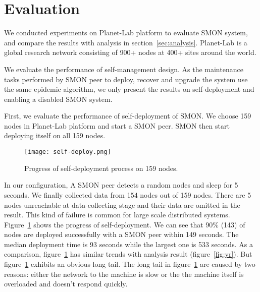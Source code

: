 \section{Evaluation}
\label{sec:eval}

We conducted experiments on Planet-Lab platform to evaluate
SMON system, and compare the results with analysis in
section~\ref{sec:analysis}. Planet-Lab is a global research network
consisting of 900+ nodes at 400+ sites around the
world.

%

We evaluate the performance of self-management design. As
the maintenance tasks performed by SMON peer to deploy,
recover and upgrade the system use the same epidemic
algorithm, we only present the results on self-deployment
and enabling a disabled SMON system. 

First, we evaluate the performance of self-deployment of
SMON.  We choose 159 nodes in Planet-Lab platform and start
a SMON peer. SMON then start deploying itself on all 159
nodes.

\begin{figure}
\centering
\texttt{[image: self-deploy.png]}
\caption{Progress of self-deployment process on 159
nodes.}
\label{fig:self-deploy}
\end{figure}

In our configuration, A SMON peer detects a random nodes and
sleep for 5 seconds. We finally collected data from 154
nodes out of 159 nodes. There are 5 nodes unreachable at
data-collecting stage and their data are omitted in the
result. This kind of failure is common for large scale
distributed systems.  Figure~\ref{fig:self-deploy} shows the
progress of self-deployment. We can see that 90\% (143) of
nodes are deployed successfully with a SMON peer within 149
seconds. The median deployment time is 93 seconds while the
largest one is 533 seconds. As a comparison,
figure~\ref{fig:self-deploy} has similar trends with
analysis result (figure~\ref{fig:yr}). But
figure~\ref{fig:self-deploy} exhibits an obvious long tail.
The long tail in figure~\ref{fig:self-deploy} are caused by
two reasons: either the network to the machine is slow or
the the machine itself is overloaded and doesn't respond
quickly.

